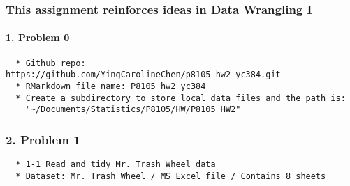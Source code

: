 \documentclass[]{article}
\let\oldparagraph\paragraph
\renewcommand{\paragraph}[1]{\oldparagraph{#1}\mbox{}}
\begin{document}
\hypertarget{this-assignment-reinforces-ideas-in-data-wrangling-i}{%
\subsubsection{This assignment reinforces ideas in Data Wrangling
I}\label{this-assignment-reinforces-ideas-in-data-wrangling-i}}

\hypertarget{problem-0}{%
\paragraph{1. Problem 0}\label{problem-0}}

\begin{verbatim}
  * Github repo: https://github.com/YingCarolineChen/p8105_hw2_yc384.git
  * RMarkdown file name: P8105_hw2_yc384
  * Create a subdirectory to store local data files and the path is:
    "~/Documents/Statistics/P8105/HW/P8105 HW2"
\end{verbatim}

\hypertarget{problem-1}{%
\subsubsection{2. Problem 1}\label{problem-1}}

\begin{verbatim}
  * 1-1 Read and tidy Mr. Trash Wheel data
  * Dataset: Mr. Trash Wheel / MS Excel file / Contains 8 sheets
\end{verbatim}
\end{document}
